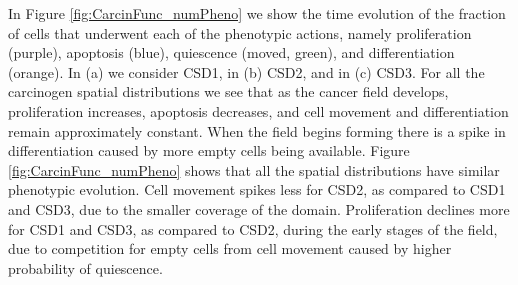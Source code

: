 \documentclass[\main/thesis.tex]{subfiles}
\begin{document}
In Figure \ref{fig:CarcinFunc_numPheno} we show the time evolution of the fraction of cells that underwent each of the phenotypic actions, namely proliferation (purple), apoptosis (blue), quiescence (moved, green), and differentiation (orange). In (a) we consider CSD1, in (b) CSD2, and in (c) CSD3. For all the carcinogen spatial distributions we see that as the cancer field develops, proliferation increases, apoptosis decreases, and cell movement and differentiation remain approximately constant. When the field begins forming there is a spike in differentiation caused by more empty cells being available. Figure \ref{fig:CarcinFunc_numPheno} shows that all the spatial distributions have similar phenotypic evolution. Cell movement spikes less for CSD2, as compared to CSD1 and CSD3, due to the smaller coverage of the domain. Proliferation declines more for CSD1 and CSD3, as compared to CSD2, during the early stages of the field, due to competition for empty cells from cell movement caused by higher probability of quiescence. 
\end{document}
